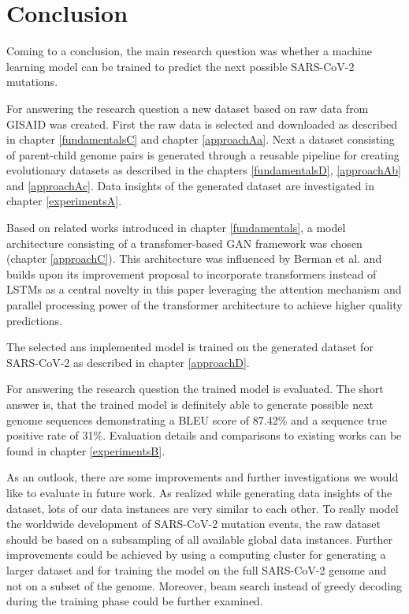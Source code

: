 \section{Conclusion} \label{conclusion}

Coming to a conclusion, the main research question was whether a machine learning model can be trained to predict the next possible \ac{SARS-CoV-2} mutations. 

For answering the research question a new dataset based on raw data from \ac{GISAID} was created. First the raw data is selected and downloaded as described in chapter \ref{fundamentalsC} and chapter \ref{approachAa}. Next a dataset consisting of parent-child genome pairs is generated through a reusable pipeline for creating evolutionary datasets as described in the chapters \ref{fundamentalsD}, \ref{approachAb} and \ref{approachAc}. Data insights of the generated dataset are investigated in chapter \ref{experimentsA}.

Based on related works introduced in chapter \ref{fundamentals}, a model ar\-chi\-tec\-tu\-re consisting of a transfomer-based \ac{GAN} framework was chosen (chapter \ref{approachC}). This ar\-chi\-tec\-tu\-re was influenced by Berman et al. \cite{Berman2020} and builds upon its improvement proposal to incorporate transformers instead of \acp{LSTM} as a central novelty in this paper leveraging the attention mechanism and parallel processing power of the transformer architecture to achieve higher quality predictions. 

The selected ans implemented model is trained on the generated dataset for \ac{SARS-CoV-2} as de\-scri\-bed in chapter \ref{approachD}.

For answering the research question the trained model is evaluated. The short answer is, that the trained model is definitely able to generate possible next genome sequences demonstrating a \ac{BLEU} score of 87.42\% and a sequence true positive rate of 31\%. Evaluation details and comparisons to existing works can be found in chapter \ref{experimentsB}.


\vspace{0.5cm}

As an outlook, there are some improvements and further investigations we would like to evaluate in future work. As realized while generating data insights of the dataset, lots of our data instances are very similar to each other. To really model the worldwide development of \ac{SARS-CoV-2} mutation events, the raw dataset should be based on a subsampling of all available global data instances. Further improvements could be achieved by using a computing cluster for generating a larger dataset and for training the model on the full \ac{SARS-CoV-2} genome and not on a subset of the genome. Moreover, beam search instead of greedy decoding during the training phase could be further examined.
